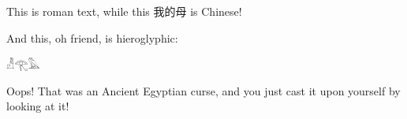 \documentclass[12pt]{article}
\begin{document}
This is roman text, while this 我的母 is Chinese!

And this, oh friend, is hieroglyphic:

𓁚𓂀𓅓

Oops! That was an Ancient Egyptian curse, and you just cast it upon yourself by looking at it!
\end{document}
